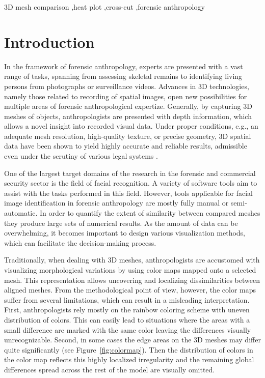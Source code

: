 \documentclass[final,5p,times]{elsarticle}
\begin{document}
\begin{frontmatter}
\begin{keyword}
3D mesh comparison \sep heat plot \sep cross-cut \sep forensic anthropology

\end{keyword}

\end{frontmatter}

\linenumbers



\section{Introduction}
In the framework of forensic anthropology, experts are presented with a vast range of tasks, spanning from assessing skeletal remains to identifying living persons from photographs or surveillance videos. 
Advances in 3D technologies, namely those related to recording of spatial images, open new possibilities for multiple areas of forensic anthropological expertize.
Generally, by capturing 3D meshes of objects, anthropologists are presented with depth information, which allows a novel insight into recorded visual data. 
Under proper conditions, e.g., an adequate mesh resolution, high-quality texture, or precise geometry, 3D spatial data have been shown to yield highly accurate and reliable results, admissible even under the scrutiny of various legal systems \cite{urbanova2015testing}.

One of the largest target domains of the research in the forensic and commercial security sector is the field of facial recognition. 
A variety of software tools aim to assist with the tasks performed in this field.
However, tools applicable for facial image identification in forensic anthropology are mostly fully manual or semi-automatic.
In order to quantify the extent of similarity between compared meshes they produce large sets of numerical results. 
As the amount of data can be overwhelming, it becomes important to design various visualization methods, which can facilitate the decision-making process.

Traditionally, when dealing with 3D meshes, anthropologists are accustomed with visualizing morphological variations by using color maps mapped onto a selected mesh.
This representation allows uncovering and localizing dissimilarities between aligned meshes. 
From the methodological point of view, however, the color maps suffer from several limitations, which can result in a misleading interpretation.
First, anthropologists rely mostly on the rainbow coloring scheme with uneven distribution of colors. 
This can easily lead to situations where the areas with a small difference are marked with the same color leaving the differences visually unrecognizable.
Second, in some cases the edge areas on the 3D meshes may differ quite significantly (see Figure~\ref{fig:colormap}).
Then the distribution of colors in the color map reflects this highly localized irregularity and the remaining global differences spread across the rest of the model are visually omitted.
\end{document}
